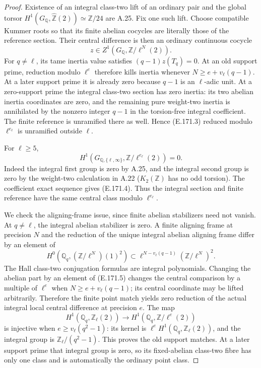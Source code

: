 \begin{proof}
Existence of an integral class-two lift of an ordinary pair and
the global torsor \(H^1(G_{\mathbb Q},\widehat{\mathbb Z}(2))
\simeq\mathbb Z/24\) are A.25. Fix one such lift. Choose
compatible Kummer roots so that its finite abelian cocycles are
literally those of the reference section. Their central difference
is then an ordinary continuous cocycle
\[
             z\in Z^1(G_{\mathbb Q},\mathbb Z/\ell^N(2)).
 \tag{E.171.3}
\]
For \(q\ne\ell\), its tame inertia value satisfies
\((q-1)z(T_q)=0\). At an old support prime, reduction modulo
\(\ell^e\) therefore kills inertia whenever
\(N\ge e+v_\ell(q-1)\). At a later support prime it is
already zero because \(q-1\) is an \(\ell\)-adic unit.
At a zero-support prime the integral class-two section has zero
inertia: its two abelian inertia coordinates are zero, and the
remaining pure weight-two inertia is annihilated by the nonzero
integer \(q-1\) in the torsion-free integral coefficient.
The finite reference is unramified there as well. Hence (E.171.3)
reduced modulo \(\ell^{e_\ell}\) is unramified outside
\(\ell\).

For \(\ell\ge5\),
\[
 H^1(G_{\mathbb Q,\{\ell,\infty\}},
                 \mathbb Z/\ell^{e_\ell}(2))=0.
 \tag{E.171.4}
\]
Indeed the integral first group is zero by A.25, and the integral
second group is zero by the weight-two calculation in A.22
(\(K_2(\mathbb Z)\) has no odd torsion). The coefficient exact
sequence gives (E.171.4). Thus the integral section and finite
reference have the same central class modulo \(\ell^{e_\ell}\).

We check the aligning-frame issue, since finite abelian stabilizers
need not vanish. At \(q\ne\ell\), the integral abelian
stabilizer is zero. A finite aligning frame at precision \(N\)
and the reduction of the unique integral abelian aligning frame
differ by an element of
\[
 H^0(\mathbb Q_q,(\mathbb Z/\ell^N)(1)^2)
 \subset \ell^{N-v_\ell(q-1)}
               (\mathbb Z/\ell^N)^2.
 \tag{E.171.5}
\]
The Hall class-two conjugation formulas are integral polynomials.
Changing the abelian part by an element of (E.171.5) changes the
central comparison by a multiple of \(\ell^e\) when
\(N\ge e+v_\ell(q-1)\); its central coordinate may be lifted
arbitrarily. Therefore the finite point match yields zero reduction
of the actual integral local central difference at precision \(e\).
The map
\[
 H^1(\mathbb Q_q,\mathbb Z_\ell(2))
       \longrightarrow H^1(\mathbb Q_q,\mathbb Z/\ell^e(2))
 \tag{E.171.6}
\]
is injective when \(e\ge v_\ell(q^2-1)\): its kernel is
\(\ell^e H^1(\mathbb Q_q,\mathbb Z_\ell(2))\), and the
integral group is \(\mathbb Z_\ell/(q^2-1)\).
This proves the old support matches. At a later support prime
that integral group is zero, so its fixed-abelian class-two fibre
has only one class and is automatically the ordinary point class.


\end{proof}
